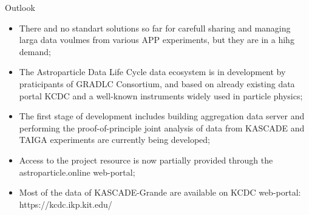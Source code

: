 \begin{frame}{Outlook}
    \begin{itemize}
      \setlength{\itemsep}{0pt}
        \item There and no standart solutions so far for carefull sharing and managing larga data voulmes from various APP experiments, but they are in a hihg demand;
        \item The Astroparticle Data Life Cycle data ecosystem is in development by praticipants of GRADLC Consortium, and based on already existing data portal KCDC and a well-known instruments widely used in particle physics;
        \item The first stage of development includes building aggregation data server and performing the proof-of-principle joint analysis of data from KASCADE and TAIGA experiments are currently being developed;
        \item Access to the project resource is now partially provided through the astroparticle.online web-portal;
        \item Most of the data of KASCADE-Grande are available on KCDC web-portal: \textcolor{kit-blue70}{https://kcdc.ikp.kit.edu/}
    \end{itemize}
\end{frame}

